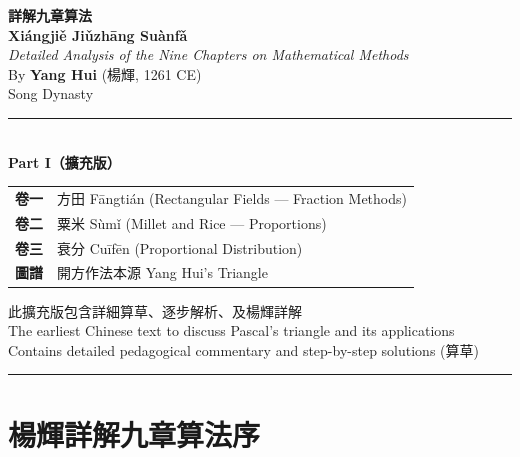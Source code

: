 \documentclass[11pt,a4paper]{article}
\begin{document}
\begin{titlepage}
\begin{center}
\vspace*{2.5cm}

{\Huge\bfseries\color{titlecolor} 詳解九章算法}\\[0.8cm]
{\LARGE\bfseries\color{sectioncolor} Xiángjiě Jiǔzhāng Suànfǎ}\\[1.5cm]
{\Large\textit{Detailed Analysis of the Nine Chapters on Mathematical Methods}}\\[2cm]
{\large By \textbf{Yang Hui} (楊輝, 1261 CE)}\\[0.5cm]
{\large Song Dynasty}\\[2.5cm]

\rule{0.6\textwidth}{0.8pt}\\[1.5cm]

{\Large\bfseries Part I（擴充版）}\\[1cm]

\begin{tabular}{cl}
\textbf{卷一} & 方田 \quad Fāngtián \quad (Rectangular Fields --- Fraction Methods)\\[0.4cm]
\textbf{卷二} & 粟米 \quad Sùmǐ \quad (Millet and Rice --- Proportions)\\[0.4cm]
\textbf{卷三} & 衰分 \quad Cuīfēn \quad (Proportional Distribution)\\[0.4cm]
\textbf{圖譜} & 開方作法本源 \quad Yang Hui's Triangle \\
\end{tabular}

\vfill

{\small 此擴充版包含詳細算草、逐步解析、及楊輝詳解}\\[0.3cm]
{\small The earliest Chinese text to discuss Pascal's triangle and its applications}\\[0.3cm]
{\small Contains detailed pedagogical commentary and step-by-step solutions (算草)}\\[1cm]

\rule{0.4\textwidth}{0.4pt}

\end{center}
\end{titlepage}

\tableofcontents
\newpage

\section*{楊輝詳解九章算法序}
\end{document}
